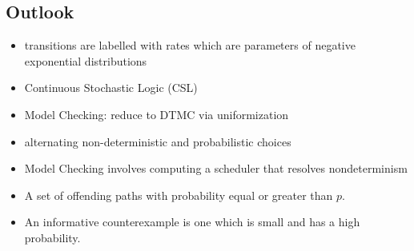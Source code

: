 \documentclass[a4paper, 10pt]{article}
\begin{document}
\subsection{Outlook}
\begin{mdframed}[roundcorner=5pt,
subtitlebelowline=false,subtitleaboveline=false,
subtitlebackgroundcolor=blue!30,
frametitlerule=true,
frametitlebackgroundcolor=blue!30,
frametitle={Continuous Time Markov Chain (CTMC)}
]
\begin{itemize}
    \item transitions are labelled with rates which are parameters of negative exponential distributions
    \item Continuous Stochastic Logic (CSL)
    \item Model Checking: reduce to DTMC via uniformization
\end{itemize}
\begin{itemize}
    \item alternating non-deterministic and probabilistic choices
    \item Model Checking involves computing a scheduler that resolves nondeterminism
\end{itemize}
\begin{itemize}
    \item A set of offending paths with probability equal or greater than $p$.
    \item An informative counterexample is one which is small and has a high probability.
\end{itemize}
\end{mdframed}


\end{document}
